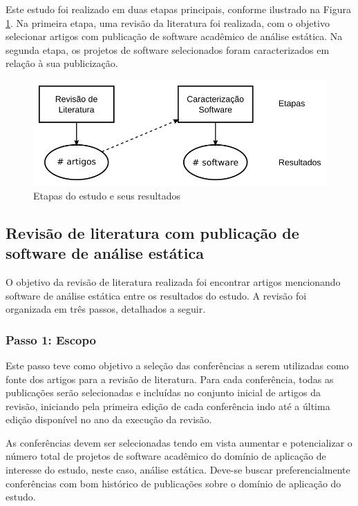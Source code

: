 Este estudo foi realizado em duas etapas principais, conforme ilustrado na
Figura \ref{estudo1-etapas}. Na primeira etapa, uma revisão da literatura
foi realizada, com o objetivo selecionar
artigos com publicação de software acadêmico de análise estática. 
Na segunda etapa, os projetos de software selecionados foram caracterizados
em relação à sua publicização.

\begin{figure}[h]
  \center
  \includegraphics[scale=0.4]{imagens/estudo1-etapas.png}
  \caption{Etapas do estudo e seus resultados}
  \label{estudo1-etapas}
\end{figure}

\subsection{Revisão de literatura com publicação de software de análise estática}

O objetivo da revisão de literatura realizada foi encontrar artigos mencionando
software de análise estática entre os resultados do estudo. A revisão foi
organizada em três passos, detalhados a seguir.

\subsubsection{Passo 1: Escopo}

Este passo teve como objetivo a seleção das conferências a serem utilizadas como fonte dos
artigos para a revisão de literatura. 
Para cada conferência, todas as publicações serão selecionadas e
incluídas no conjunto inicial de artigos da revisão, iniciando pela primeira
edição de cada conferência indo até a última edição disponível no ano da execução da revisão.

As conferências devem ser selecionadas tendo em vista aumentar e potencializar
o número total de projetos de software acadêmico do domínio de aplicação de
interesse do estudo, neste caso, análise estática. Deve-se buscar
preferencialmente conferências com bom histórico de publicações sobre o domínio
de aplicação do estudo.

